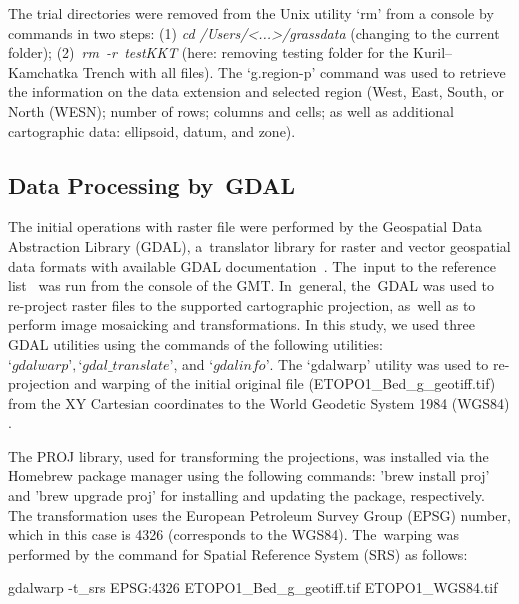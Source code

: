 \documentclass[technologies,article,accept,pdftex,moreauthors]{Definitions/mdpi}
\begin{document}
The trial directories were removed from the Unix utility ‘rm’ from a console by commands in two steps: (1) \emph{cd /Users/{<...>}/grassdata} (changing to the current folder); \mbox{(2) \emph{rm -r testKKT}} (here: removing testing folder for the Kuril--Kamchatka Trench with all files).
The ‘g.region-p’ command was used to retrieve the information on the data extension and selected region (West, East, South, or North (WESN); number of rows; columns and cells; as well as additional cartographic data: ellipsoid, datum, and zone). 

\subsection{Data Processing by~GDAL}

The initial operations with raster file were performed by the Geospatial Data Abstraction Library (GDAL), a~translator library for raster and vector geospatial data formats {with available }GDAL documentation~\cite{GDAL}. The~input to the reference list~\cite{GDAL} was run from the console of the GMT. In~general, the~GDAL was used to re-project raster files to the supported cartographic projection, as~well as to perform image mosaicking and transformations{. }In this study, we used three GDAL utilities using the commands of the following utilities:\\ 
$‘gdalwarp’, ‘gdal\_translate’$, and $‘gdalinfo’${. }The ‘gdalwarp’ utility was used to re-projection and warping of the initial original file (ETOPO1\_Bed\_g\_geotiff.tif) from the XY Cartesian coordinates to the World Geodetic System 1984 (WGS84) \cite{Defense}. 

{The PROJ library, used for transforming the projections, was installed via the Homebrew package manager using the following commands: 'brew install proj' and 'brew upgrade proj' for installing and updating the package, respectively. }The transformation uses the European Petroleum Survey Group (EPSG) number, which in this case is 4326 (corresponds to the WGS84). The~warping was performed by the command for Spatial Reference System (SRS) as follows: 

\begin{spverbatim}
gdalwarp -t_srs EPSG:4326 ETOPO1_Bed_g_geotiff.tif ETOPO1_WGS84.tif
\end{spverbatim} 

\end{document}
